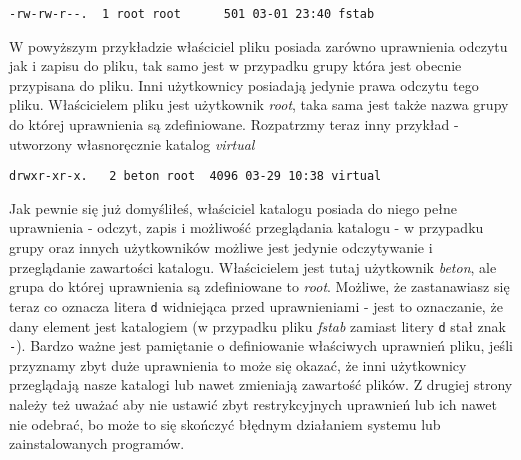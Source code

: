 \begin{verbatim}
-rw-rw-r--.  1 root root      501 03-01 23:40 fstab
\end{verbatim}
W powyższym przykładzie właściciel pliku posiada zarówno uprawnienia odczytu jak i zapisu do pliku, tak samo jest w przypadku grupy która jest obecnie przypisana do pliku. Inni użytkownicy posiadają jedynie prawa odczytu tego pliku. Właścicielem pliku jest użytkownik \textit{root}, taka sama jest także nazwa grupy do której uprawnienia są zdefiniowane. Rozpatrzmy teraz inny przykład - utworzony własnoręcznie katalog \textit{virtual}
\begin{verbatim}
drwxr-xr-x.   2 beton root  4096 03-29 10:38 virtual
\end{verbatim}
Jak pewnie się już domyśliłeś, właściciel katalogu posiada do niego pełne uprawnienia - odczyt, zapis i możliwość przeglądania katalogu - w przypadku grupy oraz innych użytkowników możliwe jest jedynie odczytywanie i przeglądanie zawartości katalogu. Właścicielem jest tutaj użytkownik \textit{beton}, ale grupa do której uprawnienia są zdefiniowane to \textit{root}. Możliwe, że zastanawiasz się teraz co oznacza litera \texttt{d} widniejąca przed uprawnieniami - jest to oznaczanie, że dany element jest katalogiem (w przypadku pliku \textit{fstab} zamiast litery \texttt{d} stał znak \texttt{-}).
\newline
\newline
Bardzo ważne jest pamiętanie o definiowanie właściwych uprawnień pliku, jeśli przyznamy zbyt duże uprawnienia to może się okazać, że inni użytkownicy przeglądają nasze katalogi lub nawet zmieniają zawartość plików. Z drugiej strony należy też uważać aby nie ustawić zbyt restrykcyjnych uprawnień lub ich nawet nie odebrać, bo może to się skończyć błędnym działaniem systemu lub zainstalowanych programów.

